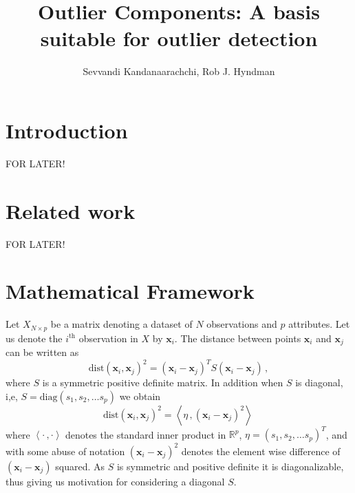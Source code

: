 \documentclass[11pt]{article}
\newcommand{\dist}{\text{dist}}
\newcommand{\diag}{\text{diag}}
\begin{document}
\title{Outlier Components: A basis suitable for outlier detection}
\author{Sevvandi Kandanaarachchi, Rob J. Hyndman}
\maketitle
{}

\section{Introduction}
FOR LATER!

\section{Related work}
FOR LATER!

\section{Mathematical Framework}\label{sec:MathFrame}
Let $X_{N \times p}$ be a matrix denoting a dataset of $N$ observations and $p$ attributes. Let us denote the  $i^{\text{th}}$ observation in $X$ by $\bm{x}_i$. The  distance between points $\bm{x}_i$ and $\bm{x}_j$  can be written as 
\begin{equation}\label{eq:secMF1}
\dist(\bm{x}_i, \bm{x}_j)^2 = \left( \bm{x}_i - \bm{x}_j \right)^T S \left( \bm{x}_i - \bm{x}_j \right) \, , 
\end{equation}
where $S$ is a symmetric positive definite matrix.  In addition when $S$ is diagonal, i,e, $S = \diag(s_1, s_2, \ldots s_p)$ we obtain
\begin{equation}\label{eq:secMF2}
    \dist(\bm{x}_i, \bm{x}_j)^2 = \left\langle \eta\, ,  \left( \bm{x}_i - \bm{x}_j \right)^2 \right\rangle\, 
\end{equation}
where $\left\langle \cdot\, , \cdot \right\rangle$ denotes the standard inner product in $\mathbb{R}^p$,   $\eta = \left(s_1, s_2, \ldots s_p\right)^T$, and with some abuse of notation $\left( \bm{x}_i - \bm{x}_j \right)^2$ denotes the element wise difference of $\left( \bm{x}_i - \bm{x}_j \right)$ squared. As $S$ is symmetric and positive definite  it is diagonalizable, thus giving us motivation for considering a diagonal $S$. 
\end{document}
